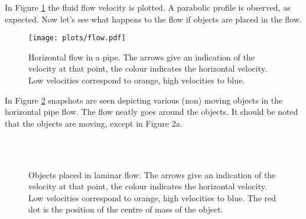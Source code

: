 In Figure \ref{fig:flow1} the fluid flow velocity is plotted. A parabolic profile is observed, as expected. Now let's see what happens to the flow if objects are placed in the flow.

\begin{figure}[ht!]
\centering
\texttt{[image: plots/flow.pdf]}
\caption{Horizontal flow in a pipe. The arrows give an indication of the velocity at that point, the colour indicates the horizontal velocity. Low velocities correspond to orange, high velocities to blue. }
\label{fig:flow1}
\end{figure}



In Figure \ref{fig:flow2} snapshots are seen depicting various (non) moving objects in the horizontal pipe flow. The flow neatly goes around the objects. It should be noted that the objects are moving, except in Figure 2a.

\begin{figure}[ht!] \flushleft
      \\
    \\
       
 \caption{Objects placed in laminar flow. The arrows give an indication of the velocity at that point, the colour indicates the horizontal velocity. Low velocities correspond to orange, high velocities to blue. The red dot is the position of the centre of mass of the object. }
\label{fig:flow2}

\end{figure}
